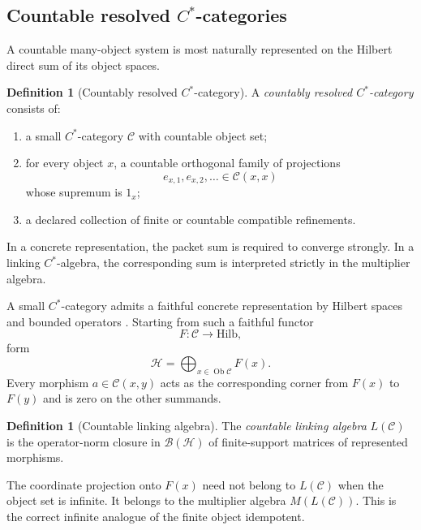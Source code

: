\documentclass[11pt]{article}
\theoremstyle{definition}
\newtheorem{definition}[theorem]{Definition}
\theoremstyle{remark}
\begin{document}
\subsection{Countable resolved $C^*$-categories}

A countable many-object system is most naturally represented on the Hilbert direct sum of its object spaces.

\begin{definition}[Countably resolved $C^*$-category]
A \emph{countably resolved $C^*$-category} consists of:
\begin{enumerate}[label=\textup{(C\arabic*)}]
\item a small $C^*$-category $\mathcal C$ with countable object set;
\item for every object $x$, a countable orthogonal family of projections
\[
e_{x,1},e_{x,2},\ldots\in\mathcal C(x,x)
\]
whose supremum is $1_x$;
\item a declared collection of finite or countable compatible refinements.
\end{enumerate}
In a concrete representation, the packet sum is required to converge strongly.  In a linking $C^*$-algebra, the corresponding sum is interpreted strictly in the multiplier algebra.
\end{definition}

A small $C^*$-category admits a faithful concrete representation by Hilbert spaces and bounded operators \cite{Mitchener2002}.  Starting from such a faithful functor
\[
F:\mathcal C\longrightarrow\mathrm{Hilb},
\]
form
\[
\mathcal H=\bigoplus_{x\in\operatorname{Ob}\mathcal C}F(x).
\]
Every morphism $a\in\mathcal C(x,y)$ acts as the corresponding corner from $F(x)$ to $F(y)$ and is zero on the other summands.

\begin{definition}[Countable linking algebra]
The \emph{countable linking algebra} $L(\mathcal C)$ is the operator-norm closure in $\mathcal B(\mathcal H)$ of finite-support matrices of represented morphisms.
\end{definition}

The coordinate projection onto $F(x)$ need not belong to $L(\mathcal C)$ when the object set is infinite.  It belongs to the multiplier algebra $M(L(\mathcal C))$.  This is the correct infinite analogue of the finite object idempotent.
\end{document}
